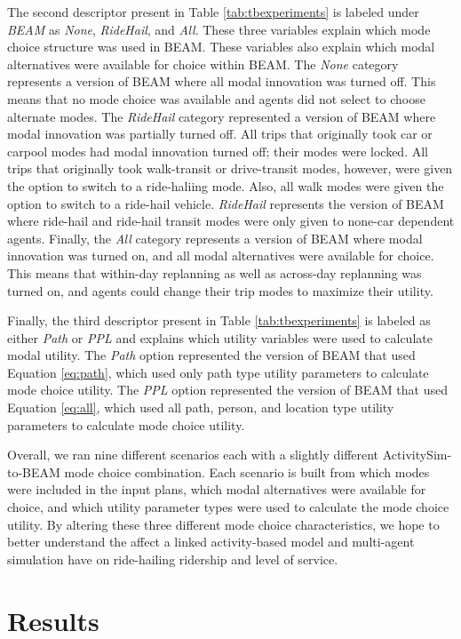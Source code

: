 \documentclass[fancy, masters]{byuthesis}
\begin{document}
The second descriptor present in Table \ref{tab:tbexperiments} is labeled under \emph{BEAM} as \emph{None}, \emph{RideHail}, and \emph{All}. These three variables explain which mode choice structure was used in BEAM. These variables also explain which modal alternatives were available for choice within BEAM. The \emph{None} category represents a version of BEAM where all modal innovation was turned off. This means that no mode choice was available and agents did not select to choose alternate modes. The \emph{RideHail} category represented a version of BEAM where modal innovation was partially turned off. All trips that originally took car or carpool modes had modal innovation turned off; their modes were locked. All trips that originally took walk-transit or drive-transit modes, however, were given the option to switch to a ride-haliing mode. Also, all walk modes were given the option to switch to a ride-hail vehicle. \emph{RideHail} represents the version of BEAM where ride-hail and ride-hail transit modes were only given to none-car dependent agents. Finally, the \emph{All} category represents a version of BEAM where modal innovation was turned on, and all modal alternatives were available for choice. This means that within-day replanning as well as across-day replanning was turned on, and agents could change their trip modes to maximize their utility.

Finally, the third descriptor present in Table \ref{tab:tbexperiments} is labeled as either \emph{Path} or \emph{PPL} and explains which utility variables were used to calculate modal utility. The \emph{Path} option represented the version of BEAM that used Equation \eqref{eq:path}, which used only path type utility parameters to calculate mode choice utility. The \emph{PPL} option represented the version of BEAM that used Equation \eqref{eq:all}, which used all path, person, and location type utility parameters to calculate mode choice utility.

Overall, we ran nine different scenarios each with a slightly different ActivitySim-to-BEAM mode choice combination. Each scenario is built from which modes were included in the input plans, which modal alternatives were available for choice, and which utility parameter types were used to calculate the mode choice utility. By altering these three different mode choice characteristics, we hope to better understand the affect a linked activity-based model and multi-agent simulation have on ride-hailing ridership and level of service.

\hypertarget{results}{%
\chapter{Results}\label{results}}
\end{document}

